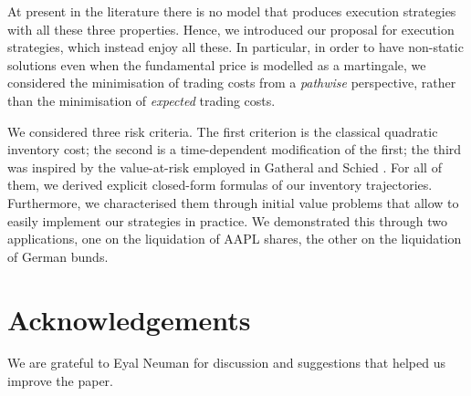\documentclass[10pt,a4paper]{article}
\begin{document}
At present in the literature there is no model that produces execution strategies with all these three properties. Hence, we introduced our proposal for execution strategies, which  instead enjoy all these. In particular, in order to have non-static solutions even when the fundamental price is modelled as a martingale, we considered the minimisation of  trading costs from a \emph{pathwise} perspective, rather than the minimisation of \emph{expected} trading costs. 

We considered three risk criteria. The first criterion is the classical quadratic inventory cost; the second is a time-dependent modification of the first; the third was inspired by the value-at-risk employed in Gatheral and Schied \cite{GS11opt}.  For all of them, we derived explicit closed-form formulas of our inventory trajectories. Furthermore, we characterised them through initial value problems that allow to easily implement our strategies in practice. We demonstrated this through two applications, one on the liquidation of AAPL shares, the other on the liquidation of German bunds.  


\section*{Acknowledgements}
We are grateful to Eyal Neuman for discussion and suggestions that helped us improve the paper.





\end{document}
